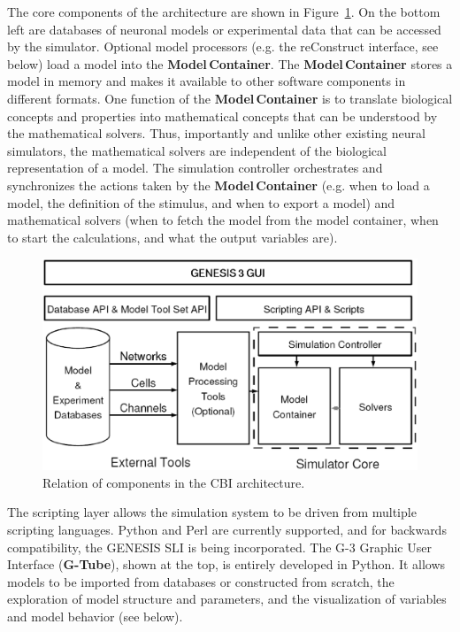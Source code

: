 \documentclass[12pt]{article}
\begin{document}
The core components of the architecture are shown in
Figure~\ref{fig:cbi-arch}. On the bottom left are databases of
neuronal models or experimental data that can be accessed by the
simulator. Optional model processors (e.g. the reConstruct interface,
see below) load a model into the {\bf Model\,Container}.  The {\bf Model\,Container}
stores a model in memory and makes it available to other software
components in different formats.  One function of the {\bf Model\,Container}
is to translate biological concepts and properties into mathematical
concepts that can be understood by the mathematical solvers. Thus,
importantly and unlike other existing neural simulators, the
mathematical solvers are independent of the biological representation
of a model. The simulation controller orchestrates and synchronizes
the actions taken by the {\bf Model\,Container} (e.g. when to load a model,
the definition of the stimulus, and when to export a model) and
mathematical solvers (when to fetch the model from the model
container, when to start the calculations, and what the output
variables are).

\begin{figure}[ht]
  \centering
    \includegraphics[scale=0.4]{figures/G3arch.eps}
  \caption{Relation of components in the CBI architecture.}
  \label{fig:cbi-arch}
\end{figure}

The scripting layer allows the simulation system to be driven from
multiple scripting languages. Python and Perl are currently supported,
and for backwards compatibility, the GENESIS SLI is being
incorporated. The G-3 Graphic User Interface ({\bf G-Tube}), shown at the top,
is entirely developed in Python.  It allows models to be imported from
databases or constructed from scratch, the exploration of model
structure and parameters, and the visualization of variables and model
behavior (see below).
\end{document}
